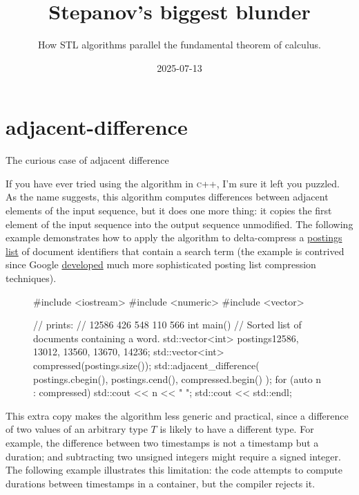 \documentclass{article}
\title{Stepanov's biggest blunder}
\subtitle{How STL algorithms parallel the fundamental theorem of calculus.}
\date{2025-07-13}
\begin{document}
\section{adjacent-difference}{The curious case of adjacent difference}

If you have ever tried using the \href{http://www.en.cppreference.com/w/cpp/algorithm/adjacent_difference.html}{} algorithm in \textsc{c++},
I'm sure it left you puzzled.
As the name suggests, this algorithm computes differences between adjacent elements of the input sequence,
but it does one more thing: it copies the first element of the input sequence into the output sequence unmodified.
The following example demonstrates how to apply the algorithm to delta-compress a \href{https://en.wikipedia.org/wiki/Inverted_index}{postings list} of document identifiers that contain a search term
(the example is contrived since Google \href{https://static.googleusercontent.com/media/research.google.com/en//people/jeff/WSDM09-keynote.pdf}{developed} much more sophisticated posting list compression techniques).

\begin{figure}
\begin{code}
#include <iostream>
#include <numeric>
#include <vector>

// prints:
// 12586 426 548 110 566
int main() {
    // Sorted list of documents containing a word.
    std::vector<int> postings{{12586, 13012, 13560, 13670, 14236}};
    std::vector<int> compressed(postings.size());
    std::adjacent_difference(
        postings.cbegin(),
        postings.cend(),
        compressed.begin()
    );
    for (auto n : compressed) std::cout << n << " ";
    std::cout << std::endl;
}
\end{code}
\end{figure}

This extra copy makes the algorithm less generic and practical,
since a difference of two values of an arbitrary type $T$ is likely to have a different type.
For example, the difference between two timestamps is not a timestamp but a duration;
and subtracting two unsigned integers might require a signed integer.
The following example illustrates this limitation: the code attempts to compute durations between timestamps in a container, but the compiler rejects it.
\end{document}
